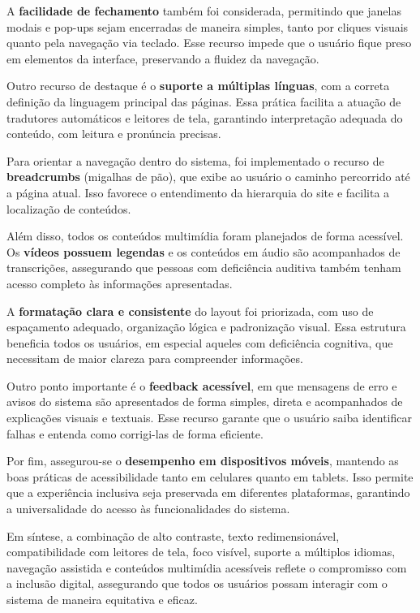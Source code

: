 A \textbf{facilidade de fechamento} também foi considerada, permitindo que janelas modais e pop-ups sejam encerradas de maneira simples, tanto por cliques visuais quanto pela navegação via teclado. Esse recurso impede que o usuário fique preso em elementos da interface, preservando a fluidez da navegação.  

Outro recurso de destaque é o \textbf{suporte a múltiplas línguas}, com a correta definição da linguagem principal das páginas. Essa prática facilita a atuação de tradutores automáticos e leitores de tela, garantindo interpretação adequada do conteúdo, com leitura e pronúncia precisas.  

Para orientar a navegação dentro do sistema, foi implementado o recurso de \textbf{breadcrumbs} (migalhas de pão), que exibe ao usuário o caminho percorrido até a página atual. Isso favorece o entendimento da hierarquia do site e facilita a localização de conteúdos.  

Além disso, todos os conteúdos multimídia foram planejados de forma acessível. Os \textbf{vídeos possuem legendas} e os conteúdos em áudio são acompanhados de transcrições, assegurando que pessoas com deficiência auditiva também tenham acesso completo às informações apresentadas.  

A \textbf{formatação clara e consistente} do layout foi priorizada, com uso de espaçamento adequado, organização lógica e padronização visual. Essa estrutura beneficia todos os usuários, em especial aqueles com deficiência cognitiva, que necessitam de maior clareza para compreender informações.  

Outro ponto importante é o \textbf{feedback acessível}, em que mensagens de erro e avisos do sistema são apresentados de forma simples, direta e acompanhados de explicações visuais e textuais. Esse recurso garante que o usuário saiba identificar falhas e entenda como corrigi-las de forma eficiente.  

Por fim, assegurou-se o \textbf{desempenho em dispositivos móveis}, mantendo as boas práticas de acessibilidade tanto em celulares quanto em tablets. Isso permite que a experiência inclusiva seja preservada em diferentes plataformas, garantindo a universalidade do acesso às funcionalidades do sistema.

Em síntese, a combinação de alto contraste, texto redimensionável, compatibilidade com leitores de tela, foco visível, suporte a múltiplos idiomas, navegação assistida e conteúdos multimídia acessíveis reflete o compromisso com a inclusão digital, assegurando que todos os usuários possam interagir com o sistema de maneira equitativa e eficaz.


